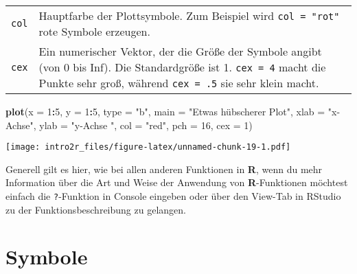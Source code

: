 \documentclass[
]{book}
\newenvironment{Shaded}{\begin{snugshade}}{\end{snugshade}}
\newcommand{\DataTypeTok}[1]{\textcolor[rgb]{0.13,0.29,0.53}{#1}}
\newcommand{\DecValTok}[1]{\textcolor[rgb]{0.00,0.00,0.81}{#1}}
\newcommand{\KeywordTok}[1]{\textcolor[rgb]{0.13,0.29,0.53}{\textbf{#1}}}
\newcommand{\NormalTok}[1]{#1}
\newcommand{\OperatorTok}[1]{\textcolor[rgb]{0.81,0.36,0.00}{\textbf{#1}}}
\newcommand{\StringTok}[1]{\textcolor[rgb]{0.31,0.60,0.02}{#1}}
\begin{document}
\begin{longtable}[]{@{}ll@{}}
\begin{minipage}[t]{0.10\columnwidth}\raggedright
\texttt{col}\strut
\end{minipage} & \begin{minipage}[t]{0.84\columnwidth}\raggedright
Hauptfarbe der Plottsymbole. Zum Beispiel wird \texttt{col\ =\ "rot"} rote Symbole erzeugen.\strut
\end{minipage}\tabularnewline
\begin{minipage}[t]{0.10\columnwidth}\raggedright
\texttt{cex}\strut
\end{minipage} & \begin{minipage}[t]{0.84\columnwidth}\raggedright
Ein numerischer Vektor, der die Größe der Symbole angibt (von 0 bis Inf). Die Standardgröße ist 1. \texttt{cex\ =\ 4} macht die Punkte sehr groß, während \texttt{cex\ =\ .5} sie sehr klein macht.\strut
\end{minipage}\tabularnewline
\bottomrule
\end{longtable}

\begin{Shaded}
\begin{Highlighting}[]
\KeywordTok{plot}\NormalTok{(}\DataTypeTok{x =} \DecValTok{1}\OperatorTok{:}\DecValTok{5}\NormalTok{,}
     \DataTypeTok{y =} \DecValTok{1}\OperatorTok{:}\DecValTok{5}\NormalTok{,                        }
     \DataTypeTok{type =} \StringTok{"b"}\NormalTok{,                      }
     \DataTypeTok{main =} \StringTok{"Etwas hübscherer Plot"}\NormalTok{,}
     \DataTypeTok{xlab =} \StringTok{"x-Achse"}\NormalTok{,}
     \DataTypeTok{ylab =} \StringTok{"y-Achse "}\NormalTok{,                }
     \DataTypeTok{col =} \StringTok{"red"}\NormalTok{,                     }
     \DataTypeTok{pch =} \DecValTok{16}\NormalTok{,                        }
     \DataTypeTok{cex =} \DecValTok{1}\NormalTok{)                         }
\end{Highlighting}
\end{Shaded}

\texttt{[image: intro2r\_files/figure-latex/unnamed-chunk-19-1.pdf]}

Generell gilt es hier, wie bei allen anderen Funktionen in \textbf{R}, wenn du mehr Information über die Art und Weise der Anwendung von \textbf{R}-Funktionen möchtest einfach die \texttt{?}-Funktion in Console eingeben oder über den View-Tab in RStudio zu der Funktionsbeschreibung zu gelangen.

\hypertarget{symbole}{%
\section{Symbole}\label{symbole}}
\end{document}
